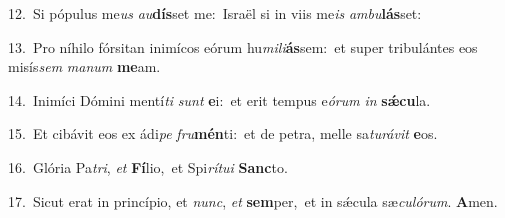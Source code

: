 {\numbfont\textcolor{\numbcolor}{12.}}~Si pópulus me\textit{us} \textit{au}\-\textbf{dís}set me:~\star Israël si in viis me\textit{is} \textit{am}\-\textit{bu}\textbf{lás}set:\par
{\numbfont\textcolor{\numbcolor}{13.}}~Pro níhilo fórsitan inimícos eórum hu\-\textit{mi}\-\textit{li}\textbf{ás}sem:~\star et super tribulántes eos misís\textit{sem} \textit{ma}\-\textit{num} \textbf{me}\-am.\par
{\numbfont\textcolor{\numbcolor}{14.}}~Inimíci Dómini mentí\textit{ti} \textit{sunt} \textbf{e}\-i:~\star et erit tempus e\-\textit{ó}\-\textit{rum} \textit{in} \textbf{sǽ}\-\textbf{cu}la.\par
{\numbfont\textcolor{\numbcolor}{15.}}~Et cibávit eos ex ádi\textit{pe} \textit{fru}\-\textbf{mén}ti:~\star et de petra, melle sa\-\textit{tu}\-\textit{rá}\textit{vit} \textbf{e}\-os.\par
{\numbfont\textcolor{\numbcolor}{16.}}~Glória Pa\-\textit{tri}\-, \textit{et} \textbf{Fí}\-lio,~\star et Spi\-\textit{rí}\-\textit{tu}\textit{i} \textbf{Sanc}\-to.\par
{\numbfont\textcolor{\numbcolor}{17.}}~Sicut erat in princípio, et \textit{nunc}\-, \textit{et} \textbf{sem}\-per,~\star et in sǽcula sæ\-\textit{cu}\-\textit{ló}\textit{rum}. \textbf{A}\-men.\par
